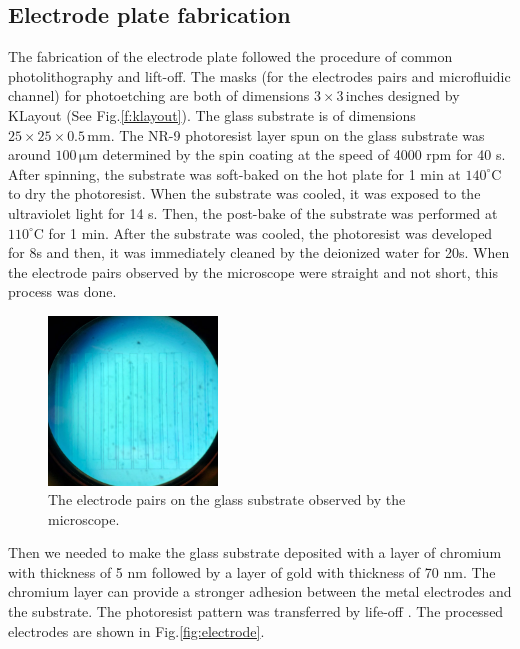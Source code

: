 \documentclass[journal,svgnames,twocolumn,x11names]{IEEEtran}
\begin{document}
\subsection{Electrode plate fabrication}
The fabrication of the electrode plate followed the procedure of common photolithography and lift-off. The masks (for the electrodes pairs and microfluidic channel) for photoetching are both of dimensions $3\times3\,\mathrm{inches}$ designed by KLayout (See Fig.\ref{f:klayout}). The glass substrate is of dimensions $25\times25\times0.5\,\mathrm{mm}$. The NR-9 photoresist layer spun on the glass substrate was around $100\,\mathrm{\mu m}$ determined by the spin coating at the speed of 4000 rpm for 40 s. After spinning, the substrate was soft-baked on the hot plate for 1 min at $140^{\circ}$C to dry the photoresist. When the substrate was cooled, it was exposed to the ultraviolet light for 14 s. Then, the post-bake of the substrate was performed at $110^{\circ}$C for 1 min. After the substrate was cooled, the photoresist was developed for 8s and then, it was immediately cleaned by the deionized water for 20s. When the electrode pairs observed by the microscope were straight and not short, this process was done.
\begin{figure}[H]
    \centering
    \includegraphics[width=0.4\textwidth]{good pattern.pdf}
	\caption{The electrode pairs on the glass substrate observed by the microscope.}
	\label{fig:electrode_pairs}
	\vspace{-0.8cm}
\end{figure}
Then we needed to make the glass substrate deposited with a layer of chromium with thickness of 5 nm followed by a layer of gold with thickness of 70 nm. The chromium layer can provide a stronger adhesion between the metal electrodes and the substrate. The photoresist pattern was transferred by life-off \cite{Studer2004}. The processed electrodes are shown in Fig.\ref{fig:electrode}.
\end{document}

